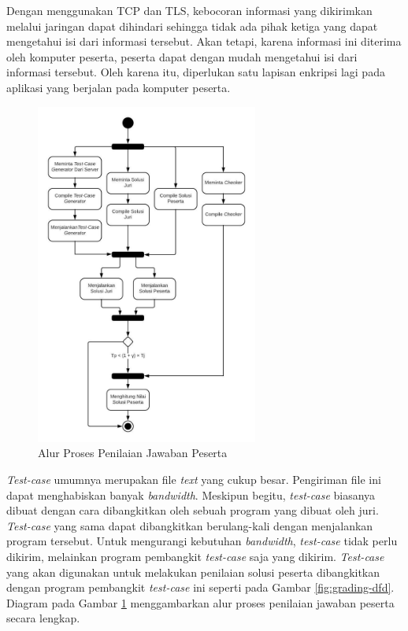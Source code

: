 \par Dengan menggunakan TCP dan TLS, kebocoran informasi yang dikirimkan melalui jaringan dapat dihindari sehingga tidak ada pihak ketiga yang dapat mengetahui isi dari informasi tersebut. Akan tetapi, karena informasi ini diterima oleh komputer peserta, peserta dapat dengan mudah mengetahui isi dari informasi tersebut. Oleh karena itu, diperlukan satu lapisan enkripsi lagi pada aplikasi yang berjalan pada komputer peserta.

\begin{figure}[ht!]
    \centering
    \includegraphics[width=0.65\textwidth]{images/total-grader-activity}
    \caption{Alur Proses Penilaian Jawaban Peserta}
    \label{fig:total-grader-activity}
\end{figure}

\par \textit{Test-case} umumnya merupakan file \textit{text} yang cukup besar. Pengiriman file ini dapat menghabiskan banyak \textit{bandwidth}. Meskipun begitu, \textit{test-case} biasanya dibuat dengan cara dibangkitkan oleh sebuah program yang dibuat oleh juri. \textit{Test-case} yang sama dapat dibangkitkan berulang-kali dengan menjalankan program tersebut. Untuk mengurangi kebutuhan \textit{bandwidth}, \textit{test-case} tidak perlu dikirim, melainkan program pembangkit \textit{test-case} saja yang dikirim. \textit{Test-case} yang akan digunakan untuk melakukan penilaian solusi peserta dibangkitkan dengan program pembangkit \textit{test-case} ini seperti pada Gambar \ref{fig:grading-dfd}. Diagram pada Gambar \ref{fig:total-grader-activity} menggambarkan alur proses penilaian jawaban peserta secara lengkap.

